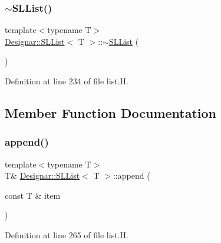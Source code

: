 \mbox{\label{class_designar_1_1_s_l_list_a129557e3a5b4555ac45ccae8aaa89f03}} 
\subsubsection{\texorpdfstring{$\sim$\+S\+L\+List()}{~SLList()}}
{\footnotesize\ttfamily template$<$typename T$>$ \\
\hyperlink{class_designar_1_1_s_l_list}{Designar\+::\+S\+L\+List}$<$ T $>$\+::$\sim$\hyperlink{class_designar_1_1_s_l_list}{S\+L\+List} (\begin{DoxyParamCaption}{ }\end{DoxyParamCaption})\hspace{0.3cm}{\ttfamily [inline]}}



Definition at line 234 of file list.\+H.



\subsection{Member Function Documentation}
\mbox{\label{class_designar_1_1_s_l_list_ae2df2707dddd8c7af8e8d878e1fb58fa}} 
\subsubsection{\texorpdfstring{append()}{append()}\hspace{0.1cm}{\footnotesize\ttfamily [1/2]}}
{\footnotesize\ttfamily template$<$typename T$>$ \\
T\& \hyperlink{class_designar_1_1_s_l_list}{Designar\+::\+S\+L\+List}$<$ T $>$\+::append (\begin{DoxyParamCaption}\item[{const T \&}]{item }\end{DoxyParamCaption})\hspace{0.3cm}{\ttfamily [inline]}}



Definition at line 265 of file list.\+H.

